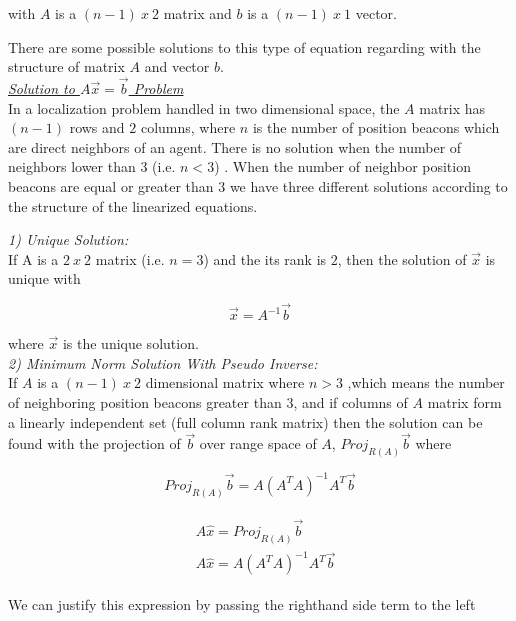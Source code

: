 with $A$ is a $(n-1)\ x\ 2$ matrix and $b$ is a $(n-1)\ x\ 1$ vector.

There are some possible solutions to this type of equation regarding with the structure of matrix $A$ and vector $b$.\\


\underline {\textit{Solution to $A\vec{x} = \vec{b}$ Problem}}\\
In a localization problem handled in two dimensional space, the $A$ matrix has $(n-1)$ rows and $2$ columns, where $n$ is the number of position beacons which are direct neighbors of an agent. There is no solution when the number of neighbors lower than $3$ (i.e. $n<3$) \cite{22}. When the number of neighbor position beacons are equal or greater than $3$ we have three different solutions according to the structure of the linearized equations.

\textit{1) Unique Solution:}\\
 If A is a $2\ x\ 2$ matrix (i.e. $n=3$) and the its rank is $2$, then the solution of $\vec{x}$ is unique with \cite{linear_ders_notu}

\begin{equation}
\vec{x} = A^{-1}\vec{b}
\end{equation}

where $\vec{x}$ is the unique solution. \\
  
\textit{ 2) Minimum Norm Solution With Pseudo Inverse:} \\  
If $A$ is a $(n-1)\ x\ 2$ dimensional matrix where $n>3$ ,which means the number of neighboring position beacons greater than $3$, and if columns of $A$ matrix form a linearly independent set (full column rank matrix) then the solution can be found with the projection of $\vec{b}$ over range space of $A$, $Proj_{R(A)}\vec{b}$ where \cite{linear_ders_notu}

\begin{equation}
Proj_{R(A)}\vec{b} = A (A^TA)^{-1}A^T\vec{b}
\end{equation}

\begin{align}
\begin{split}
& A\hat{x} = Proj_{R(A)}\vec{b}\\
& A\hat{x} = A(A^TA)^{-1}A^T\vec{b}
\end{split}
\end{align}
 
We can justify this expression by passing the righthand side term to the left

